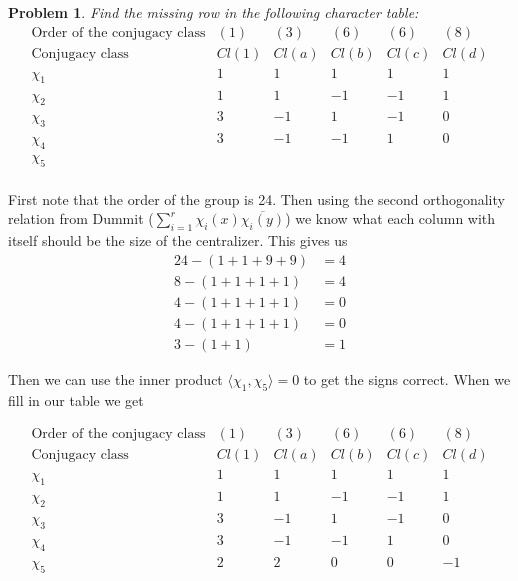 \documentclass[10pt]{article}
\newcommand{\sk}{\vskip 10mm}
\theoremstyle{plain}
\newtheorem{problem}{Problem}
\theoremstyle{remark}
\begin{document}
\sk

\begin{problem}
  Find the missing row in the following character table:
  \[
    \begin{array}{c|ccccc}
      \text{Order of the conjugacy class} & (1) & (3) & (6) & (6) & (8)\\
      \text{Conjugacy class} & Cl(1) & Cl(a) & Cl(b) & Cl(c) & Cl(d)\\
      \hline
      \chi_1 & 1 & 1 & 1 & 1 & 1\\
      \chi_2 & 1 & 1 & -1 & -1 & 1\\
      \chi_3 & 3 & -1 & 1 & -1 & 0\\
      \chi_4 & 3 & -1 & -1 & 1 & 0\\
      \chi_5 &&&&&\\
    \end{array}
  \]
\end{problem}

First note that the order of the group is 24. Then using the second
orthogonality relation from Dummit ($\sum_{i=1}^r\chi_i(x)\overline{\chi_i(y)}$) we
know what each column with itself should be the size of the centralizer.
This gives us
\begin{align*}
  24 - (1+1+9+9) &= 4\\
  8 - (1+1+1+1) &= 4\\
  4 - (1+1+1+1) &= 0\\
  4 - (1+1+1+1) &= 0\\
  3 - (1+1) &= 1
\end{align*}

Then we can use the inner product $\langle \chi_1,\chi_5\rangle=0$ to get the signs correct.
When we fill in our table we get

\[
  \begin{array}{c|ccccc}
    \text{Order of the conjugacy class} & (1) & (3) & (6) & (6) & (8)\\
    \text{Conjugacy class} & Cl(1) & Cl(a) & Cl(b) & Cl(c) & Cl(d)\\
    \hline
    \chi_1 & 1 & 1 & 1 & 1 & 1\\
    \chi_2 & 1 & 1 & -1 & -1 & 1\\
    \chi_3 & 3 & -1 & 1 & -1 & 0\\
    \chi_4 & 3 & -1 & -1 & 1 & 0\\
    \chi_5 & 2 & 2 & 0 & 0 & -1\\
  \end{array}
\]

\sk
\end{document}
